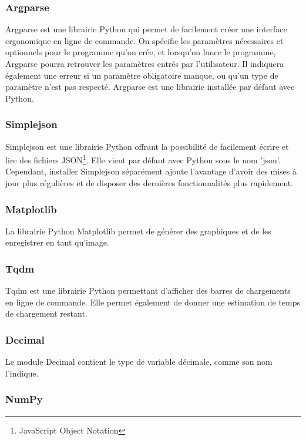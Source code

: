 \documentclass[11pt]{article}
\begin{document}
\subsubsection{Argparse} \label{ARGPARSE}

Argparse est une librairie Python qui permet de facilement créer une interface ergonomique en ligne de commande.
On spécifie les paramètres nécessaires et optionnels pour le programme qu'on crée, et lorsqu'on lance le programme, Argparse pourra retrouver les paramètres entrés par l'utilisateur.
Il indiquera également une erreur si un paramètre obligatoire manque, ou qu'un type de paramètre n'est pas respecté.
Argparse est une librairie installée par défaut avec Python.

\subsubsection{Simplejson}

Simplejson est une librairie Python offrant la possibilité de facilement écrire et lire des fichiers JSON\footnote{JavaScript Object Notation}.
Elle vient par défaut avec Python sous le nom 'json'.
Cependant, installer Simplejson séparément ajoute l'avantage d'avoir des mises à jour plus régulières et de disposer des dernières fonctionnalités plus rapidement.

\subsubsection{Matplotlib} \label{MATPLOTLIB}

La librairie Python Matplotlib permet de générer des graphiques et de les enregistrer en tant qu'image.

\subsubsection{Tqdm}

Tqdm est une librairie Python permettant d'afficher des barres de chargements en ligne de commande.
Elle permet également de donner une estimation de temps de chargement restant.

\subsubsection{Decimal}

Le module Decimal contient le type de variable décimale, comme son nom l'indique.

\subsubsection{NumPy}
\end{document}
